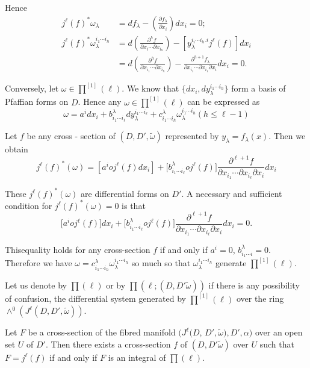 Hence 
\begin{align*}
  j^\ell (f)^* \omega_{\lambda} &  = df_{\lambda} - \left(\frac{\partial
    f_{\lambda}}{\partial x_i}\right) dx_i = 0; \\ 
  j^\ell (f)^* \omega^{i_1 \cdots i_h}_{\lambda} &= d
  \left(\frac{\partial^h f}{\partial x_i \cdots \partial
    x_{i_h}}\right) - \left[
    y^{i_i \cdots i_h.i}_{\lambda} j^\ell (f) \right] dx_i \\ 
  & = d   \left(\frac{\partial^h f}{\partial x_{i_1} \cdots \partial x_{i_h}}\right)
  - \frac{\partial^{h + 1} f_{\lambda}}{\partial x_{i_1} \cdots
    \partial x_{i_1} \partial x_i} dx_i = 0. 
\end{align*}

Conversely, let $\omega \in \prod^{[1]} (\ell)$. We know that $\bigg\{
dx_i , dy_\lambda^{i_1 \cdots i_h}\bigg\}$ form a basis of Pfaffian forms on
$D$. Hence any $\omega \in \prod^{[1]} (\ell)$ can be expressed as 
$$
\omega = a^i dx_i + b^{\lambda}_{i_1 \cdots i_\ell} dy^{i_1 \cdots
  i_\ell}_\lambda + c^{\lambda}_{i_1 \cdots i_h} \omega^{i_1 \cdots
  i_h}_{\lambda} (h \leq \ell -1) 
$$

Let $f$ be any cross - section of $(D, D', \tilde{\omega})$
represented by $y_{\lambda} = f_{\lambda} (x)$. Then we obtain 
$$
j^\ell (f)^* (\omega) = [a^i o j^\ell (f) dx_i] + \bigg[
  b^{\lambda}_{i_1 \cdots i_\ell} o j^{\ell}(f) \bigg]
\frac{\partial^{\ell + 1}f}{\partial x_{i_1} \cdots \partial x_{i_\ell}
  \partial x_i}dx_i 
$$

These $j^\ell (f)^* (\omega)$ are differential forms on $D'$. A
necessary and sufficient condition for $j^\ell (f)^* (\omega) = 0$ is
that 
$$
\bigg[ a^i o j^\ell (f) \bigg] dx_i + \bigg[ b^\lambda_{i_1 \cdots
    i_\ell} oj^\ell (f) \bigg] \frac{\partial^{\ell + 1}f}{\partial
  x_{i_1} \cdots \partial x_{i_\ell} \partial x_i} dx_i = 0. 
$$

This\pageoriginale equality holds for any cross-section $f$ if and only if $a^i = 0$,
$b^{\lambda}_{i_1 \cdots i} = 0$. Therefore we have $\omega =
c^{\lambda}_{i_1 \cdots i_h} \omega^{i_1 \cdots i_h}_{\lambda}$ so
much so that $\omega^{i_1 \cdots i_h}_{\lambda}$ generate $\prod^{[1]}
(\ell)$.  

Let us denote by $\prod (\ell)$ or by $\prod (\ell; (D, D'
\tilde{\omega}))$ if there is any possibility of confusion, the
differential system generated by $\prod^{[1]} (\ell)$ over the ring
$\wedge^0 (J^\ell (D, D' , \tilde{\omega}))$. 

\begin{proposition}\label{chap3:sec3.2:prop2} %
  Let $F$ be a cross-section of the fibred manifold $(J^\ell (D$, $D',
  \tilde{\omega}), D', \alpha)$ over an open set $U$ of $D'$. Then
  there exists a cross-section $f$ of $(D, D' \tilde{\omega})$ over
  $U$ such that $F = j^\ell (f)$ if and only if $F$ is an integral of
  $\prod (\ell)$. 
\end{proposition}

